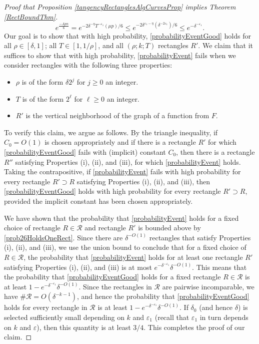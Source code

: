 \documentclass[letterpaper, reqno,11pt]{article}
\numberwithin{equation}{section}
\newcommand{\eps}{\varepsilon}
\numberwithin{thm}{section}
\theoremstyle{remark}
\begin{document}
\begin{proof}[Proof that Proposition \ref{tangencyRectanglesAlgCurvesProp} implies Theorem \ref{RectBoundThm}]
\begin{equation}\label{prob26HoldsOneRect}
e^{\frac{-Apn}{6}}= e^{-2\delta^{-\eta}T^{-\eps_1}(\mu p)/6 } \leq e^{-2\delta^{\eps_1-\eta}(\delta^{-2\eps_1})/6 }\leq e^{-\delta^{-\eps_1}}.
\end{equation}
Our goal is to show that with high probability, \eqref{probabilityEventGood} holds for all $\rho\in [\delta,1]$; all $T\in [1,1/\rho]$, and all $(\rho;k;T)$ rectangles $R'$. We claim that it suffices to show that with high probability, \eqref{probabilityEvent} fails when we consider rectangles with the following three properties:
\begin{itemize}
\item[(i)] $\rho$ is of the form $\delta 2^j$ for $j\geq 0$ an integer.
\item[(ii)] $T$ is of the form $2^\ell$ for $\ell\geq 0$ an integer.
\item[(iii)] $R'$ is the vertical neighborhood of the graph of a function from $F$.
\end{itemize}
To verify this claim, we argue as follows. By the triangle inequality, if $C_0 = O(1)$ is chosen appropriately and if there is a rectangle $R'$ for which \eqref{probabilityEventGood} fails with (implicit) constant $C_0$, then there is a rectangle $R''$ satisfying Properties (i), (ii), and (iii), for which \eqref{probabilityEvent} holds. Taking the contrapositive, if \eqref{probabilityEvent} fails with high probability for every rectangle $R'\supset R$ satisfying Properties (i), (ii), and (iii), then \eqref{probabilityEventGood} holds with high probability for every rectangle $R'\supset R$, provided the implicit constant has been chosen appropriately.

We have shown that the probability that \eqref{probabilityEvent} holds for a fixed choice of rectangle $R\in\mathcal{R}$ and rectangle $R'$ is bounded above by \eqref{prob26HoldsOneRect}. Since there are $\delta^{-O(1)}$ rectangles that satisfy Properties (i), (ii), and (iii), we use the union bound to conclude that for a fixed choice of $R\in\mathcal{R}$, the probability that \eqref{probabilityEvent} holds for at least one rectangle $R'$ satisfying Properties (i), (ii), and (iii) is at most $e^{-\delta^{-\eps_1}}\delta^{-O(1)}$. This means that the probability that \eqref{probabilityEventGood} holds for a fixed rectangle $R\in\mathcal{R}$ is at least $1-e^{-\delta^{-\eps_1}}\delta^{-O(1)}$. Since the rectangles in $\mathcal{R}$ are pairwise incomparable, we have $\#\mathcal{R}=O(\delta^{-k-1})$, and hence the probability that \eqref{probabilityEventGood} holds for every rectangle in $\mathcal{R}$ is at least $1-e^{-\delta^{-\eps_1}}\delta^{-O(1)}$. If $\delta_0$ (and hence $\delta$) is selected sufficiently small depending on $k$ and $\eps_1$ (recall that $\eps_1$ in turn depends on $k$ and $\eps$), then this quantity is at least $3/4$. This completes the proof of our claim.



\end{proof}
\end{document}
